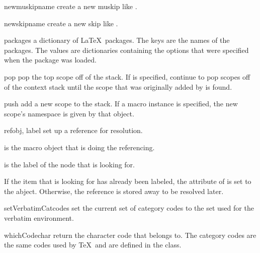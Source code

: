 \begin{methoddesc}[Context]{newmuskip}{name}
create a new muskip like .
\end{methoddesc}

\begin{methoddesc}[Context]{newskip}{name}
create a new skip like .
\end{methoddesc}

\begin{memberdesc}[Context]{packages}
a dictionary of \LaTeX\ packages.  The keys are the names of the packages.
The values are dictionaries containing the options that were specified
when the package was loaded.
\end{memberdesc}

\begin{methoddesc}[Context]{pop}{}
pop the top scope off of the stack.  If  is specified, continue
to pop scopes off of the context stack until the scope that was originally
added by  is found.
\end{methoddesc}

\begin{methoddesc}[Context]{push}{}
add a new scope to the stack.  If a macro instance  is specified,
the new scope's namespace is given by that object.
\end{methoddesc}

\begin{methoddesc}[Context]{ref}{obj, label}
set up a reference for resolution.

 is the macro object that is doing the referencing.

 is the label of the node that  is looking for.

If the item that  is looking for has already been labeled,
the  attribute of  is set to the abject.
Otherwise, the reference is stored away to be resolved later.
\end{methoddesc}

\begin{methoddesc}[Context]{setVerbatimCatcodes}{}
set the current set of category codes to the set used for the verbatim
environment.
\end{methoddesc}

\begin{methoddesc}[Context]{whichCode}{char}
return the character code that  belongs to.  The category
codes are the same codes used by \TeX\ and are defined in the
 class.
\end{methoddesc}

